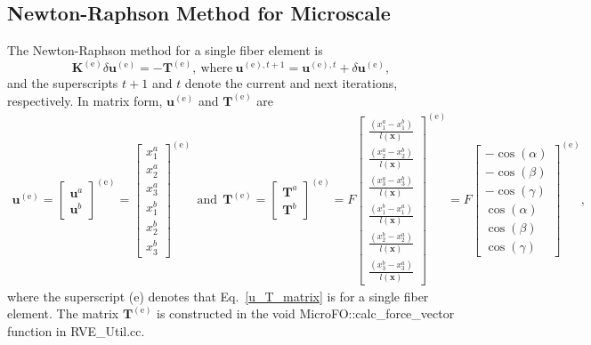 \documentclass[12pt,aps,pre]{revtex4}
\begin{document}
\subsection{Newton-Raphson Method for Microscale}
\label{subsec:Newton_Microscale}

The Newton-Raphson method for a single fiber element is
%
\begin{equation}
\textbf{K}^{(\text{e})} \delta \textbf{u}^{(\text{e})} = - \textbf{T}^{(\text{e})}, \ \text{where} \ \textbf{u}^{(\text{e}),t+1}  = \textbf{u}^{(\text{e}),t} + \delta \textbf{u}^{(\text{e})},
\label{Newton_Raphson}
\end{equation}
%
and the superscripts $t+1$ and $t$ denote the current and next iterations, respectively. In matrix form, $\textbf{u}^{(\text{e})}$ and $\textbf{T}^{(\text{e})}$ are
%
\begin{eqnarray}
\textbf{u}^{(\text{e})} = 
\begin{bmatrix}
\textbf{u}^a \\ \textbf{u}^b
\end{bmatrix}^{(\text{e})} =
%
\begin{bmatrix}
x^a_1 \\ x^a_2 \\ x^a_3 \\ x^b_1 \\ x^b_2 \\ x^b_3
\end{bmatrix}^{(\text{e})} \ \ \text{and} \ \
\textbf{T}^{(\text{e})} = 
\begin{bmatrix}
\textbf{T}^a \\ \textbf{T}^b
\end{bmatrix}^{(\text{e})} =
%
F\begin{bmatrix}
\frac{(x^a_1 - x^b_1)}{l(\textbf{x})} \\ \frac{(x^a_2 - x^b_2)}{l(\textbf{x})} \\ \frac{(x^a_3 - x^b_3)}{l(\textbf{x})} \\ \frac{(x^b_1 - x^a_1)}{l(\textbf{x})} \\ \frac{(x^b_2 - x^a_2)}{l(\textbf{x})} \\ \frac{(x^b_3 - x^a_3)}{l(\textbf{x})}
\end{bmatrix}^{(\text{e})} = 
%
F\begin{bmatrix}
-\cos(\alpha) \\ -\cos(\beta) \\ -\cos(\gamma) \\ \cos(\alpha) \\ \cos(\beta) \\ \cos(\gamma)
\end{bmatrix}^{(\text{e})} ,
\label{u_T_matrix}
\end{eqnarray}
%
where the superscript (e) denotes that Eq.\ \eqref{u_T_matrix} is for a single fiber element. The matrix $\textbf{T}^{(\text{e})}$ is constructed in the void MicroFO::calc\_force\_vector function in RVE\_Util.cc. 
\end{document}
